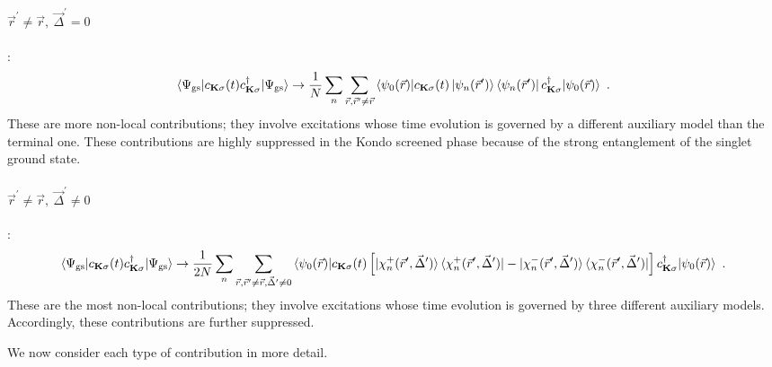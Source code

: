 \documentclass[reprint,hidelinks,onecolumn]{revtex4-2}
\begin{document}
\paragraph{\(\vec r^\prime \neq \vec r,~\vec\Delta^\prime=0\)}:
\begin{equation}\begin{aligned}
		\braket{\Psi_\text{gs} | c_{{\bf K}\sigma}(t) c^\dagger_{{\bf K}\sigma} | \Psi_\text{gs}} \to \frac{1}{N}\sum_n\sum_{\vec r, \vec r^\prime \neq \vec r} \braket{\psi_{0}(\vec r) | c_{{\bf K}\sigma}(t) \ket{\psi_n(\vec r^\prime)}\bra{\psi_n(\vec r^\prime)} c^\dagger_{{\bf K}\sigma} | \psi_{0}(\vec r)} ~.
\end{aligned}\end{equation}
These are more non-local contributions; they involve excitations whose time evolution is governed by a different auxiliary model than the terminal one. These contributions are highly suppressed in the Kondo screened phase because of the strong entanglement of the singlet ground state.

\paragraph{\(\vec r^\prime \neq \vec r,~\vec\Delta^\prime \neq 0\)}:
\begin{equation}\begin{aligned}
		\braket{\Psi_\text{gs} | c_{{\bf K}\sigma}(t) c^\dagger_{{\bf K}\sigma} | \Psi_\text{gs}} \to \frac{1}{2N}\sum_n\sum_{\vec r,\vec r^\prime \neq \vec r,\vec \Delta^\prime \neq 0} \braket{\psi_{0}(\vec r) | c_{{\bf K}\sigma}(t) \left[ \ket{\chi_n^+(\vec r^\prime,\vec\Delta^\prime)}\bra{\chi_n^+(\vec r^\prime,\vec\Delta^\prime)} - \ket{\chi_n^-(\vec r^\prime,\vec\Delta^\prime)}\bra{\chi_n^-(\vec r^\prime,\vec\Delta^\prime)}\right] c^\dagger_{{\bf K}\sigma} | \psi_{0}(\vec r)} ~.
\end{aligned}\end{equation}
These are the most non-local contributions; they involve excitations whose time evolution is governed by three different auxiliary models. Accordingly, these contributions are further suppressed.

We now consider each type of contribution in more detail.
\end{document}
